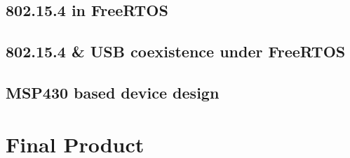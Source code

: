 	
		\subsection{802.15.4 in FreeRTOS}

		\subsection{802.15.4 \& USB coexistence under FreeRTOS}

		\subsection{MSP430 based device design}

		\section{Final Product}
